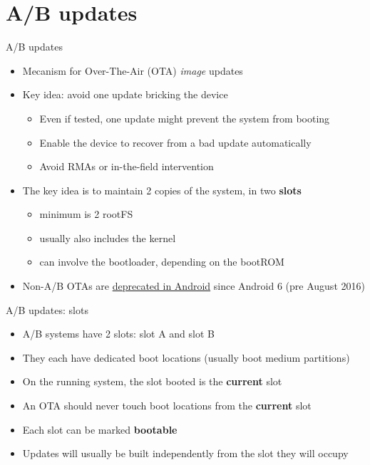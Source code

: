 \section{A/B updates}

\begin{frame}{A/B updates}
  \begin{itemize}
    \item Mecanism for Over-The-Air (OTA) \textit{image} updates
    \item Key idea: avoid one update bricking the device
    \begin{itemize}
      \item Even if tested, one update might prevent the system from booting
      \item Enable the device to recover from a bad update automatically
      \item Avoid RMAs or in-the-field intervention
    \end{itemize}
    \item The key idea is to maintain 2 copies of the system, in two \textbf{slots}
    \begin{itemize}
      \item minimum is 2 rootFS
      \item usually also includes the kernel
      \item can involve the bootloader, depending on the bootROM
    \end{itemize}
    \item Non-A/B OTAs are \href{https://source.android.com/docs/core/ota/nonab}{deprecated in Android}
          since Android 6 (pre August 2016)
  \end{itemize}
\end{frame}

\begin{frame}{A/B updates: slots}
  \begin{itemize}
    \item A/B systems have 2 slots: slot A and slot B
    \item They each have dedicated boot locations (usually boot medium partitions)
    \item On the running system, the slot booted is the \textbf{current} slot
    \item An OTA should never touch boot locations from the \textbf{current} slot
    \item Each slot can be marked \textbf{bootable}
    \item Updates will usually be built independently from the slot they will occupy
  \end{itemize}
\end{frame}

